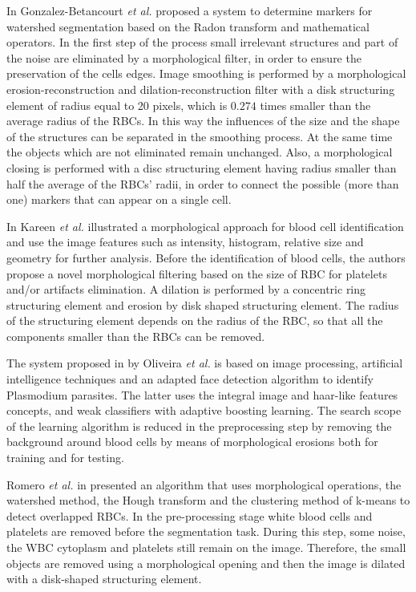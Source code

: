 \documentclass[sensors,review,submit,moreauthors,pdftex,10pt,a4paper]{mdpi}
\begin{document}
In \cite{Gonzalez2016} Gonzalez-Betancourt \emph{et al.} proposed a system to determine markers for watershed segmentation based on the Radon transform and mathematical operators. In the first step of the process small irrelevant structures and part of the noise are eliminated by a morphological filter, in order to ensure the preservation of the cells edges. Image smoothing is performed by a morphological erosion-reconstruction and dilation-reconstruction filter with a disk structuring element of radius equal to 20 pixels, which is $0.274$ times smaller than the average radius of the RBCs. In this way the influences of the size and the shape of the structures can be separated in the smoothing process. At the same time the objects which are not eliminated remain unchanged. Also, a morphological closing is performed with a disc structuring element having radius smaller than half the average of the RBCs' radii, in order to connect the possible (more than one) markers that can appear on a single cell.

In \cite{Kareem2012} Kareen \emph{et al.} illustrated a morphological approach for blood cell identification and use the image features such as intensity, histogram, relative size and geometry for further analysis. Before the identification of blood cells, the authors  propose a novel morphological filtering based on the size of RBC for platelets and/or artifacts elimination. A dilation is performed by a concentric ring structuring element and erosion by disk shaped structuring element. The radius of the structuring element depends on the radius of the RBC, so that all the components smaller than the RBCs can be removed.

The system proposed in \cite{Oliveira2017} by Oliveira \emph{et al.} is based on image processing, artificial intelligence techniques and an adapted face detection algorithm to identify Plasmodium parasites. The latter uses the integral image and haar-like features concepts, and weak classifiers with adaptive boosting learning. The search scope of the learning algorithm is reduced in the preprocessing step by removing the background around blood cells by means of morphological erosions both for training and for testing.

Romero \emph{et al.} in \cite{Romero2016} presented an algorithm that uses morphological operations, the watershed method, the Hough transform and the clustering method of k-means to detect overlapped RBCs. In the pre-processing stage white blood cells and platelets are removed before the segmentation task. During this step, some noise, the WBC cytoplasm and platelets still remain on the image. Therefore, the small objects are removed using a morphological opening and then the image is dilated with a disk-shaped structuring element.
\end{document}
